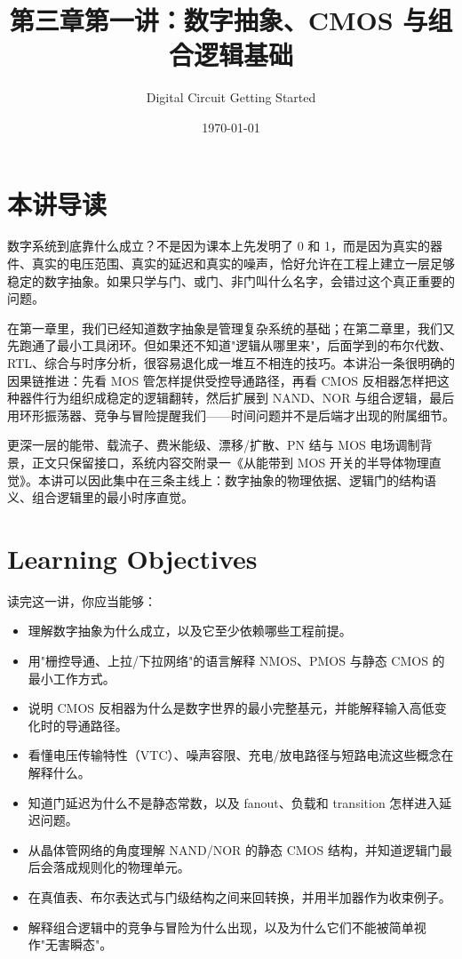 \documentclass[11pt,a4paper]{article}
\title{第三章第一讲：数字抽象、CMOS 与组合逻辑基础}
\author{Digital Circuit Getting Started}
\date{\today}
\begin{document}
\maketitle

\section{本讲导读}

数字系统到底靠什么成立？不是因为课本上先发明了 0 和 1，而是因为真实的器件、真实的电压范围、真实的延迟和真实的噪声，恰好允许在工程上建立一层足够稳定的数字抽象。如果只学与门、或门、非门叫什么名字，会错过这个真正重要的问题。

在第一章里，我们已经知道数字抽象是管理复杂系统的基础；在第二章里，我们又先跑通了最小工具闭环。但如果还不知道"逻辑从哪里来"，后面学到的布尔代数、RTL、综合与时序分析，很容易退化成一堆互不相连的技巧。本讲沿一条很明确的因果链推进：先看 MOS 管怎样提供受控导通路径，再看 CMOS 反相器怎样把这种器件行为组织成稳定的逻辑翻转，然后扩展到 NAND、NOR 与组合逻辑，最后用环形振荡器、竞争与冒险提醒我们——时间问题并不是后端才出现的附属细节。

更深一层的能带、载流子、费米能级、漂移/扩散、PN 结与 MOS 电场调制背景，正文只保留接口，系统内容交附录一《从能带到 MOS 开关的半导体物理直觉》。本讲可以因此集中在三条主线上：数字抽象的物理依据、逻辑门的结构语义、组合逻辑里的最小时序直觉。 

\section{Learning Objectives}

读完这一讲，你应当能够：

\begin{itemize}
  \item 理解数字抽象为什么成立，以及它至少依赖哪些工程前提。
  \item 用"栅控导通、上拉/下拉网络"的语言解释 NMOS、PMOS 与静态 CMOS 的最小工作方式。
  \item 说明 CMOS 反相器为什么是数字世界的最小完整基元，并能解释输入高低变化时的导通路径。
  \item 看懂电压传输特性（VTC）、噪声容限、充电/放电路径与短路电流这些概念在解释什么。
  \item 知道门延迟为什么不是静态常数，以及 fanout、负载和 transition 怎样进入延迟问题。
  \item 从晶体管网络的角度理解 NAND/NOR 的静态 CMOS 结构，并知道逻辑门最后会落成规则化的物理单元。
  \item 在真值表、布尔表达式与门级结构之间来回转换，并用半加器作为收束例子。
  \item 解释组合逻辑中的竞争与冒险为什么出现，以及为什么它们不能被简单视作"无害瞬态"。
\end{itemize}
\end{document}
